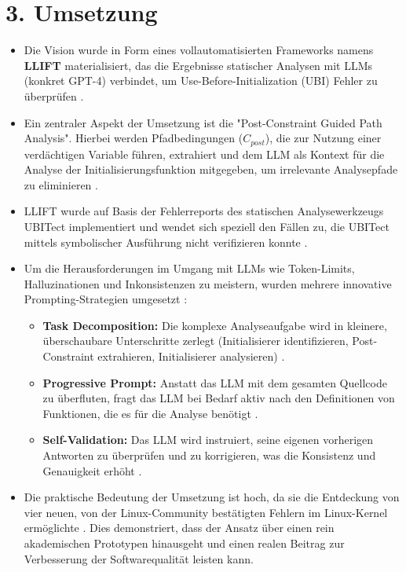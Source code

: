 \documentclass{article}
\begin{document}
\section*{3. Umsetzung}
\begin{itemize}
    \item Die Vision wurde in Form eines vollautomatisierten Frameworks namens \textbf{LLIFT} materialisiert, das die Ergebnisse statischer Analysen mit LLMs (konkret GPT-4) verbindet, um Use-Before-Initialization (UBI) Fehler zu überprüfen \cite{Li2024}.
    \item Ein zentraler Aspekt der Umsetzung ist die "Post-Constraint Guided Path Analysis". Hierbei werden Pfadbedingungen ($C_{post}$), die zur Nutzung einer verdächtigen Variable führen, extrahiert und dem LLM als Kontext für die Analyse der Initialisierungsfunktion mitgegeben, um irrelevante Analysepfade zu eliminieren \cite{Li2024}.
    \item LLIFT wurde auf Basis der Fehlerreports des statischen Analysewerkzeugs UBITect implementiert und wendet sich speziell den Fällen zu, die UBITect mittels symbolischer Ausführung nicht verifizieren konnte \cite{Li2024}.
    \item Um die Herausforderungen im Umgang mit LLMs wie Token-Limits, Halluzinationen und Inkonsistenzen zu meistern, wurden mehrere innovative Prompting-Strategien umgesetzt \cite{Li2024}:
        \begin{itemize}
            \item \textbf{Task Decomposition:} Die komplexe Analyseaufgabe wird in kleinere, überschaubare Unterschritte zerlegt (Initialisierer identifizieren, Post-Constraint extrahieren, Initialisierer analysieren) \cite{Li2024}.
            \item \textbf{Progressive Prompt:} Anstatt das LLM mit dem gesamten Quellcode zu überfluten, fragt das LLM bei Bedarf aktiv nach den Definitionen von Funktionen, die es für die Analyse benötigt \cite{Li2024}.
            \item \textbf{Self-Validation:} Das LLM wird instruiert, seine eigenen vorherigen Antworten zu überprüfen und zu korrigieren, was die Konsistenz und Genauigkeit erhöht \cite{Li2024}.
        \end{itemize}
    \item Die praktische Bedeutung der Umsetzung ist hoch, da sie die Entdeckung von vier neuen, von der Linux-Community bestätigten Fehlern im Linux-Kernel ermöglichte \cite{Li2024}. Dies demonstriert, dass der Ansatz über einen rein akademischen Prototypen hinausgeht und einen realen Beitrag zur Verbesserung der Softwarequalität leisten kann.
\end{itemize}
\end{document}
